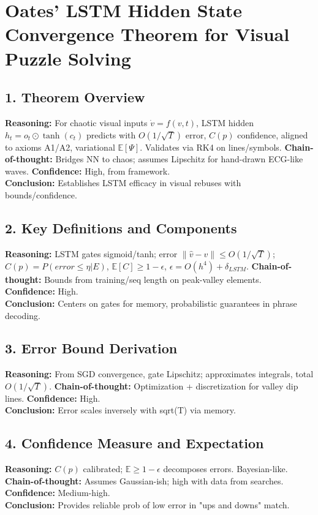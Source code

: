 \documentclass{article}
\begin{document}
\section{Oates' LSTM Hidden State Convergence Theorem for Visual Puzzle Solving}

\subsection{1. Theorem Overview}
\textbf{Reasoning:} For chaotic visual inputs \(\dot{v}=f(v,t)\), LSTM hidden \(h_t = o_t \odot \tanh(c_t)\) predicts with \(O(1/\sqrt{T})\) error, \(C(p)\) confidence, aligned to axioms A1/A2, variational \(\mathbb{E}[\Psi]\). Validates via RK4 on lines/symbols. \textbf{Chain-of-thought:} Bridges NN to chaos; assumes Lipschitz for hand-drawn ECG-like waves. \textbf{Confidence:} High, from framework.\\
\textbf{Conclusion:} Establishes LSTM efficacy in visual rebuses with bounds/confidence.

\subsection{2. Key Definitions and Components}
\textbf{Reasoning:} LSTM gates sigmoid/tanh; error \(\|\hat{v}-v\|\leq O(1/\sqrt{T})\); \(C(p)=P(error\leq\eta|E)\), \(\mathbb{E}[C]\geq1-\epsilon\), \(\epsilon=O(h^4)+\delta_{LSTM}\). \textbf{Chain-of-thought:} Bounds from training/seq length on peak-valley elements. \textbf{Confidence:} High.\\
\textbf{Conclusion:} Centers on gates for memory, probabilistic guarantees in phrase decoding.

\subsection{3. Error Bound Derivation}
\textbf{Reasoning:} From SGD convergence, gate Lipschitz; approximates integrals, total \(O(1/\sqrt{T})\). \textbf{Chain-of-thought:} Optimization + discretization for valley dip lines. \textbf{Confidence:} High.\\
\textbf{Conclusion:} Error scales inversely with sqrt(T) via memory.

\subsection{4. Confidence Measure and Expectation}
\textbf{Reasoning:} \(C(p)\) calibrated; \(\mathbb{E}\geq1-\epsilon\) decomposes errors. Bayesian-like. \textbf{Chain-of-thought:} Assumes Gaussian-ish; high with data from searches. \textbf{Confidence:} Medium-high.\\
\textbf{Conclusion:} Provides reliable prob of low error in "ups and downs" match.
\end{document}
